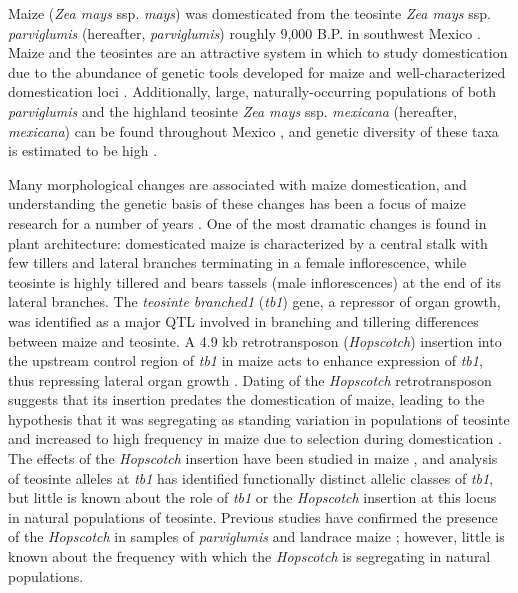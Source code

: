 \documentclass[11pt]{article} %
\begin{document}
\begin{linenumbers}
\begin{flushleft}
Maize (\emph{Zea mays} ssp. \emph{mays}) was domesticated from the teosinte \emph{Zea mays} ssp. \emph{parviglumis} (hereafter, \emph{parviglumis}) roughly 9,000 B.P. in southwest Mexico \citep{Piperno2009, Matsuoka2002}. Maize and the teosintes are an attractive system in which to study domestication due to the abundance of genetic tools developed for maize and well-characterized domestication loci \citep{Hufford2012a, Doebley2004, Hufford2012b}. 
Additionally, large, naturally-occurring populations of both \emph{parviglumis} and the highland teosinte \emph{Zea mays} ssp. \emph{mexicana} (hereafter, \emph{mexicana}) can be found throughout Mexico \citep{Wilkes1977, Hufford2013}, and genetic diversity of these taxa is estimated to be high \citep{Ross-Ibarra2009}.

Many morphological changes are associated with maize domestication, and understanding the genetic basis of these changes has been a focus of maize research for a number of years \citep{Doebley2004}. One of the most dramatic changes is found in plant architecture: domesticated maize is characterized by a central stalk with few tillers and lateral branches terminating in a female inflorescence, while teosinte is highly tillered and bears tassels (male inflorescences) at the end of its lateral branches. The \emph{teosinte branched1} (\emph{tb1}) gene, a repressor of organ growth, was identified as a major QTL involved in  branching \citep{DoebleyStecGustus1995} and tillering \citep{DoebleyStec1991} differences between maize and teosinte.  A 4.9 kb retrotransposon (\emph{Hopscotch}) insertion into the upstream control region of \emph{tb1} in maize acts to enhance expression of \emph{tb1}, thus repressing lateral organ growth \citep{Doebley1997, Studer2011}.  Dating of the \emph{Hopscotch} retrotransposon suggests that its insertion predates the domestication of maize, leading to the hypothesis that it was segregating as standing variation in populations of teosinte and increased to high frequency in maize due to selection during domestication \citep{Studer2011}. The effects of the \emph{Hopscotch} insertion have been studied in maize \citep{Studer2011}, and analysis of teosinte alleles at \emph{tb1} has identified functionally distinct allelic classes of \emph{tb1}\citep{StuderDoebley2012}, but little is known about the role of \emph{tb1} or the \emph{Hopscotch} insertion at this locus in natural populations of teosinte. Previous studies have confirmed the presence of the \emph{Hopscotch} in samples of \emph{parviglumis} and landrace maize \citep{Studer2011}; however, little is known about the frequency with which the \emph{Hopscotch} is segregating in natural populations.


\end{flushleft}
\end{linenumbers}
\end{document}
